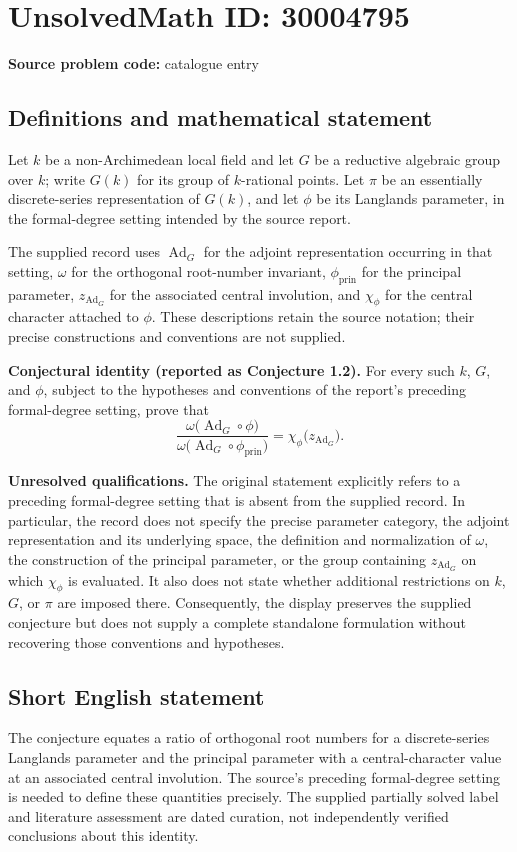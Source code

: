 \documentclass[11pt]{article}
\begin{document}
\section*{UnsolvedMath ID: 30004795}
\textbf{Source problem code:} catalogue entry
\subsection{Definitions and mathematical statement}
Let \(k\) be a non-Archimedean local field and let \(G\) be a reductive algebraic group over \(k\); write \(G(k)\) for its group of \(k\)-rational points. Let \(\pi\) be an essentially discrete-series representation of \(G(k)\), and let \(\phi\) be its Langlands parameter, in the formal-degree setting intended by the source report.

The supplied record uses \(\operatorname{Ad}_G\) for the adjoint representation occurring in that setting, \(\omega\) for the orthogonal root-number invariant, \(\phi_{\operatorname{prin}}\) for the principal parameter, \(z_{\operatorname{Ad}_G}\) for the associated central involution, and \(\chi_\phi\) for the central character attached to \(\phi\). These descriptions retain the source notation; their precise constructions and conventions are not supplied.

\textbf{Conjectural identity (reported as Conjecture 1.2).} For every such \(k\), \(G\), and \(\phi\), subject to the hypotheses and conventions of the report's preceding formal-degree setting, prove that
\[
\frac{\omega\bigl(\operatorname{Ad}_G\circ\phi\bigr)}
     {\omega\bigl(\operatorname{Ad}_G\circ\phi_{\operatorname{prin}}\bigr)}
=\chi_\phi\bigl(z_{\operatorname{Ad}_G}\bigr).
\]

\textbf{Unresolved qualifications.} The original statement explicitly refers to a preceding formal-degree setting that is absent from the supplied record. In particular, the record does not specify the precise parameter category, the adjoint representation and its underlying space, the definition and normalization of \(\omega\), the construction of the principal parameter, or the group containing \(z_{\operatorname{Ad}_G}\) on which \(\chi_\phi\) is evaluated. It also does not state whether additional restrictions on \(k\), \(G\), or \(\pi\) are imposed there. Consequently, the display preserves the supplied conjecture but does not supply a complete standalone formulation without recovering those conventions and hypotheses.
\subsection{Short English statement}
The conjecture equates a ratio of orthogonal root numbers for a discrete-series Langlands parameter and the principal parameter with a central-character value at an associated central involution. The source's preceding formal-degree setting is needed to define these quantities precisely. The supplied partially solved label and literature assessment are dated curation, not independently verified conclusions about this identity.
\end{document}
